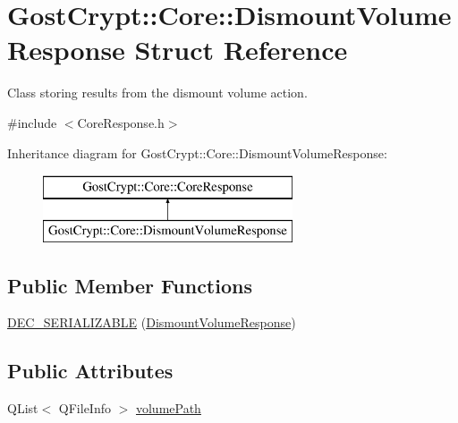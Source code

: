 \hypertarget{struct_gost_crypt_1_1_core_1_1_dismount_volume_response}{}\section{Gost\+Crypt\+:\+:Core\+:\+:Dismount\+Volume\+Response Struct Reference}
\label{struct_gost_crypt_1_1_core_1_1_dismount_volume_response}


Class storing results from the dismount volume action.  




{\ttfamily \#include $<$Core\+Response.\+h$>$}

Inheritance diagram for Gost\+Crypt\+:\+:Core\+:\+:Dismount\+Volume\+Response\+:\begin{figure}[H]
\begin{center}
\leavevmode
\includegraphics[height=2.000000cm]{struct_gost_crypt_1_1_core_1_1_dismount_volume_response}
\end{center}
\end{figure}
\subsection*{Public Member Functions}
\begin{DoxyCompactItemize}
\item 
\hyperlink{struct_gost_crypt_1_1_core_1_1_dismount_volume_response_ac5341f41f0895b183eb411c2d7a5523e}{D\+E\+C\+\_\+\+S\+E\+R\+I\+A\+L\+I\+Z\+A\+B\+LE} (\hyperlink{struct_gost_crypt_1_1_core_1_1_dismount_volume_response}{Dismount\+Volume\+Response})
\end{DoxyCompactItemize}
\subsection*{Public Attributes}
\begin{DoxyCompactItemize}
\item 
Q\+List$<$ Q\+File\+Info $>$ \hyperlink{struct_gost_crypt_1_1_core_1_1_dismount_volume_response_a26d60a0b30bcbbecd23b20722453c2e4}{volume\+Path}
\end{DoxyCompactItemize}


